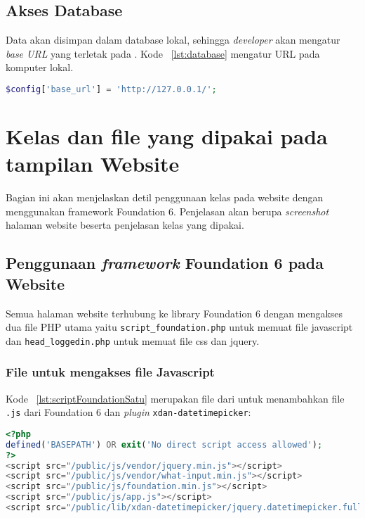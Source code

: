 \subsection{Akses Database}
Data akan disimpan dalam database lokal, sehingga \textit{developer} akan mengatur \textit{base URL} yang terletak pada . Kode ~\ref{lst:database} mengatur URL pada komputer lokal.\\

\begin{lstlisting}[language=PHP, caption=Setting database lokal,  basicstyle=\footnotesize\ttfamily, frame=single,
columns=fullflexible, keepspaces=true, breaklines=true, showstringspaces=false, label={lst:database}]
$config['base_url'] = 'http://127.0.0.1/';
\end{lstlisting}

\section{Kelas dan file yang dipakai pada tampilan Website}
Bagian ini akan menjelaskan detil penggunaan kelas pada website dengan menggunakan framework Foundation 6. Penjelasan akan berupa \textit{screenshot} halaman website beserta penjelasan kelas yang dipakai. \\

\subsection{Penggunaan \textit{framework} Foundation 6 pada Website}
Semua halaman website terhubung ke library Foundation 6 dengan mengakses dua file PHP utama yaitu \texttt{script\_foundation.php} untuk memuat file javascript dan \texttt{head\_loggedin.php} untuk memuat file css dan jquery.\\


\subsubsection{File untuk mengakses file Javascript}
\noindent Kode ~\ref{lst:scriptFoundationSatu} merupakan file dari  untuk menambahkan file \texttt{.js} dari Foundation 6 dan \textit{plugin} \texttt{xdan-datetimepicker}:
\begin{lstlisting}[language=PHP, caption=Penambahan library js, basicstyle=\footnotesize\ttfamily, frame=single,
columns=fullflexible, keepspaces=true, breaklines=true, showstringspaces=false, label={lst:scriptFoundationSatu}]
<?php
defined('BASEPATH') OR exit('No direct script access allowed');
?>
<script src="/public/js/vendor/jquery.min.js"></script>
<script src="/public/js/vendor/what-input.min.js"></script>
<script src="/public/js/foundation.min.js"></script>
<script src="/public/js/app.js"></script>
<script src="/public/lib/xdan-datetimepicker/jquery.datetimepicker.full.min.js"></script>
\end{lstlisting}

